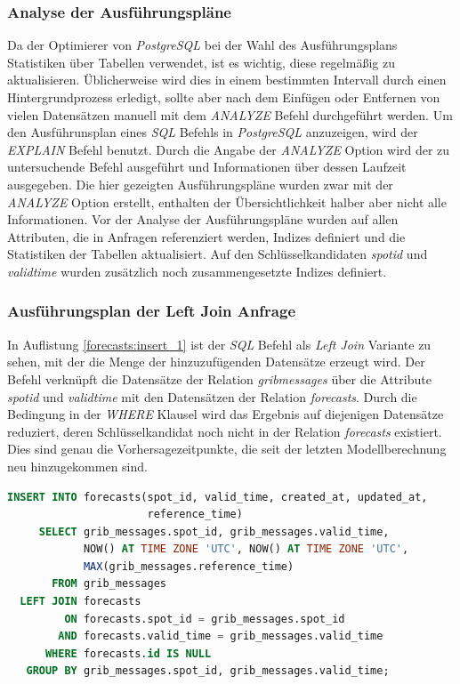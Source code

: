 \subsubsection{Analyse der Ausführungspläne}
Da der Optimierer von \textit{PostgreSQL} bei der Wahl des
Ausführungsplans Statistiken über Tabellen verwendet, ist es wichtig,
diese regelmäßig zu aktualisieren. Üblicherweise wird dies in einem
bestimmten Intervall durch einen Hintergrundprozess erledigt, sollte
aber nach dem Einfügen oder Entfernen von vielen Datensätzen manuell
mit dem \textit{ANALYZE} Befehl durchgeführt werden. Um den
Ausführunsplan eines \textit{SQL} Befehls in \textit{PostgreSQL}
anzuzeigen, wird der \textit{EXPLAIN} Befehl benutzt. Durch die Angabe
der \textit{ANALYZE} Option wird der zu untersuchende Befehl
ausgeführt und Informationen über dessen Laufzeit ausgegeben. Die hier
gezeigten Ausführungspläne wurden zwar mit der \textit{ANALYZE} Option
erstellt, enthalten der Übersichtlichkeit halber aber nicht alle
Informationen. Vor der Analyse der Ausführungspläne wurden auf allen
Attributen, die in Anfragen referenziert werden, Indizes definiert und
die Statistiken der Tabellen aktualisiert. Auf den Schlüsselkandidaten
\textit{spot\textunderscore id} und \textit{valid\textunderscore time}
wurden zusätzlich noch zusammengesetzte Indizes definiert.

\subsubsection{Ausführungsplan der Left Join Anfrage}
In Auflistung \ref{forecasts:insert_1} ist der \textit{SQL} Befehl als
\textit{Left Join} Variante zu sehen, mit der die Menge der
hinzuzufügenden Datensätze erzeugt wird. Der Befehl verknüpft die
Datensätze der Relation \textit{grib\textunderscore messages} über die
Attribute \textit{spot\textunderscore id} und
\textit{valid\textunderscore time} mit den Datensätzen der Relation
\textit{forecasts}. Durch die Bedingung in der \textit{WHERE} Klausel
wird das Ergebnis auf diejenigen Datensätze reduziert, deren
Schlüsselkandidat noch nicht in der Relation \textit{forecasts}
existiert. Dies sind genau die Vorhersagezeitpunkte, die seit der
letzten Modellberechnung neu hinzugekommen sind.

\begin{lstlisting}[captionpos=b, caption=Hinzufügen von Datensätze mittels Left Join, label=forecasts:insert_1, language=SQL]
INSERT INTO forecasts(spot_id, valid_time, created_at, updated_at, 
                      reference_time)
     SELECT grib_messages.spot_id, grib_messages.valid_time, 
            NOW() AT TIME ZONE 'UTC', NOW() AT TIME ZONE 'UTC', 
            MAX(grib_messages.reference_time)
       FROM grib_messages
  LEFT JOIN forecasts
         ON forecasts.spot_id = grib_messages.spot_id
        AND forecasts.valid_time = grib_messages.valid_time
      WHERE forecasts.id IS NULL
   GROUP BY grib_messages.spot_id, grib_messages.valid_time;
\end{lstlisting}

